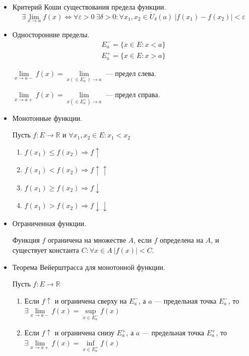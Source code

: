 \documentclass[14pt]{extarticle}
\numberwithin{equation}{section}
\newcommand{\RR}{\mathbb{R}}
\begin{document}
    \begin{itemize}
        \item
            Критерий Коши существования предела функции.
            \[
                \exists \lim\limits_{x \to a} f(x)
                \Leftrightarrow
                \forall \varepsilon > 0 \ \exists \delta > 0 :
                    \forall x_1, x_2 \in \mathring{U}_\delta(a) \ |f(x_1) - f(x_2)| < \varepsilon
            \]
        \item
            Односторонние пределы.
            \begin{gather*}
                E_a^- = \{ x \in E : x < a \}
                \\
                E_a^+ = \{ x \in E : x > a \}
            \end{gather*}

            \( \lim\limits_{x \to a-} f(x) = \lim\limits_{x ( \in E_a^- ) \to a} \) --- предел слева.

            \( \lim\limits_{x \to a+} f(x) = \lim\limits_{x ( \in E_a^+ ) \to a} \) --- предел справа.
        \item
            Монотонные функции.

            Пусть \( f : E \to \RR \) и \( \forall x_1, x_2 \in E : x_1 < x_2 \)
            \begin{enumerate}
                \item
                    \( f(x_1) \leq f(x_2) \Rightarrow f \uparrow \)
                \item
                    \( f(x_1) < f(x_2) \Rightarrow f \uparrow \uparrow \)
                \item
                    \( f(x_1) \geq f(x_2) \Rightarrow f \downarrow \)
                \item
                    \( f(x_1) > f(x_2) \Rightarrow f \downarrow \downarrow \)
            \end{enumerate}
        \item
            Ограниченная функции.

            Функция \( f \) ограничена на множестве \( A \),
            если \( f \) определена на \( A \),
            и существует константа \( C : \forall x \in A \ |f(x)| < C \).
        \item
            Теорема Вейерштрасса для монотонной функции.

            Пусть \( f : E \to \RR \)
            \begin{enumerate}
                \item
                    Если \( f \uparrow \) и ограничена сверху на \( E_a^- \),
                    а \( a \) --- предельная точка \( E_a^- \),
                    то \( \exists \lim\limits_{x \to a-} f(x) = \sup\limits_{x \in E_a^-} f(x) \)
                \item
                    Если \( f \uparrow \) и ограничена снизу \( E_a^+ \),
                    а \( a \) --- предельная точка \( E_a^+ \),
                    то \( \exists \lim\limits_{x \to a+} f(x) = \inf\limits_{x \in E_a^+} f(x) \)
            \end{enumerate}
    \end{itemize}
\end{document}
